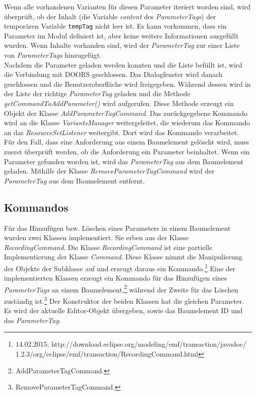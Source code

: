 Wenn alle vorhandenen Varianten für diesen Parameter iteriert worden sind, wird überprüft, ob der Inhalt (die Variable \textit{content} des \textit{ParameterTags}) der temporären Variable \texttt{tempTag} nicht leer ist. Es kann vorkommen, dass ein Parameter im Modul definiert ist, aber keine weitere Informationen ausgefüllt wurden. Wenn Inhalte vorhanden sind, wird der \textit{ParameterTag} zur einer Liste von \textit{ParameterTags} hinzugefügt.\\

Nachdem die Parameter geladen werden konnten und die Liste befüllt ist, wird die Verbindung mit DOORS geschlossen. Das Dialogfenster wird danach geschlossen und die Benutzeroberfläche wird freigegeben. Während dessen wird in der Liste der richtige \textit{ParameterTag} geladen und die Methode \textit{getCommandToAddParameter()} wird aufgerufen. Diese Methode erzeugt ein Objekt der Klasse \textit{AddParameterTagCommand}. Das zurückgegebene Kommando wird an die Klasse \textit{VariantsManager} weitergeleitet, die wiederum das Kommando an das \textit{ResourceSetListener} weitergibt. Dort wird das Kommando verarbeitet.\\


Für den Fall, dass eine Anforderung aus einem Baumelement gelöscht wird, muss zuerst überprüft werden, ob die Anforderung ein Parameter beinhaltet. Wenn ein Parameter gefunden worden ist, wird das \textit{ParameterTag} aus dem Baumelement geladen. Mithilfe der Klasse \textit{RemoveParameterTagCommand} wird der \textit{ParameterTag} aus dem Baumelement entfernt.

\subsection{Kommandos}\label{sub.Command}
Für das Hinzufügen bzw. Löschen eines Parameters in einem Baumelement wurden zwei Klassen implementiert. Sie erben aus der Klasse \textit{RecordingCommand}. Die Klasse \textit{RecordingCommand} ist eine partielle Implementierung der Klasse \textit{Command}. Diese Klasse nimmt die  Manipulierung der Objekte der Subklasse auf und erzeugt daraus ein Kommando.\footnote{14.02.2015; http://download.eclipse.org/modeling/emf/transaction/javadoc/ 1.2.3/org/eclipse/emf/transaction/RecordingCommand.html} Eine der implementierten Klassen erzeugt ein Kommando für das Hinzufügen eines \textit{ParameterTags} an einem Baumelement,\footnote{AddParameterTagCommand.} während der Zweite für das Löschen zuständig ist.\footnote{RemoveParameterTagCommand.} Der Konstruktor der beiden Klassen hat die gleichen Parameter. Es wird der aktuelle Editor-Objekt übergeben, sowie das Baumelement ID und das \textit{ParameterTag}.\\


